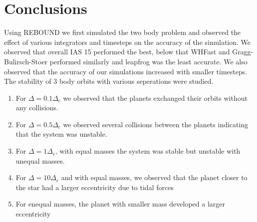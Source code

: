 \documentclass[12pt,a4paper]{article}
\begin{document}


\section{Conclusions}
  Using REBOUND we first simulated the two body problem and observed the effect of various integrators and timesteps on the accuracy of the simulation. We observed that overall IAS 15 performed the best, 
  below that WHFast and Gragg-Bulirsch-Stoer performed similarly and leapfrog was the least accurate. We also observed that the accuracy of our simulations increased with smaller timesteps.\\


  The stability of 3 body orbits with various seperations were studied. 
  \begin{enumerate}
    \item For $\Delta=0.1\Delta_c$ we observed that the planets exchanged their orbits without any collisions. 
    \item For $\Delta=0.5\Delta_c$ we observed several collisions between the planets indicating that the system was unstable.
    \item For $\Delta=1\Delta_c$, with equal masses the system was stable but unstable with unequal masses.
    \item For $\Delta=10\Delta_c$ and with equal masses, we observed that the planet closer to the star had a larger eccentricity due to tidal forces
    \item For enequal masses, the planet with smaller mass developed a larger eccentricity
  \end{enumerate}
\end{document}
